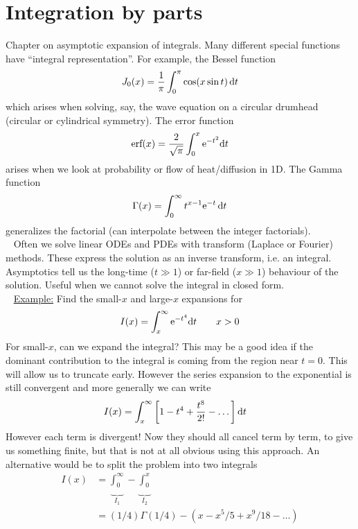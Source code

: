 \chapter{Integration by parts}
Chapter on asymptotic expansion of integrals. Many different special functions have ``integral representation''. For example, the Bessel function
\begin{gather*}
	J_0(x) = \frac{1}{\pi} \int_{0}^{\pi} \cos (x \sin t) \, \mathrm{d} t
\end{gather*}
which arises when solving, say, the wave equation on a circular drumhead (circular or cylindrical symmetry). The error function
\begin{gather*}
	\text{erf} (x) = \frac{2}{\sqrt{\pi}} \int_{0}^{x} \mathrm{e}^{-t^2} \mathrm{d} t
\end{gather*}
arises when we look at probability or flow of heat/diffusion in 1D. The Gamma function
\begin{gather*}
	\Gamma(x) = \int_{0}^{\infty} t^{x-1} \mathrm{e}^{-t} \, \mathrm{d} t
\end{gather*}
generalizes the factorial (can interpolate between the integer factorials). \\
\ \newline
Often we solve linear ODEs and PDEs with transform (Laplace or Fourier) methods. These express the solution as an inverse transform, i.e. an integral. Asymptotics tell us the long-time ($t \gg 1$) or far-field ($x \gg 1$) behaviour of the solution. Useful when we cannot solve the integral in closed form. \\
\ \newline
\underline{Example:} Find the small-$x$ and large-$x$ expansions for
\begin{gather*}
	I(x) = \int_{x}^{\infty} \mathrm{e}^{-t^4} \mathrm{d} t \qquad x > 0
\end{gather*}
For small-$x$, can we expand the integral? This may be a good idea if the dominant contribution to the integral is coming from the region near $t = 0$. This will allow us to truncate early. However the series expansion to the exponential is still convergent and more generally we can write
\begin{align*}
	I(x) &= \int_{x}^{\infty} \left[1 - t^4 + \frac{t^8}{2!} - \dots \right] \mathrm{d} t
\end{align*}
However each term is divergent! Now they should all cancel term by term, to give us something finite, but that is not at all obvious using this approach. An alternative would be to split the problem into two integrals
\begin{align}
	I(x) &= \underbrace{\int_{0}^{\infty}}_{I_1} - \underbrace{\int_{0}^{x}}_{I_2} \nonumber \\
	&= \left({1}/{4}\right) \Gamma\left({1}/{4}\right) - \left(x - {x^5}/{5} + {x^9}/{18} - \dots \right) \label{eqn:smallx-limit}
\end{align}

